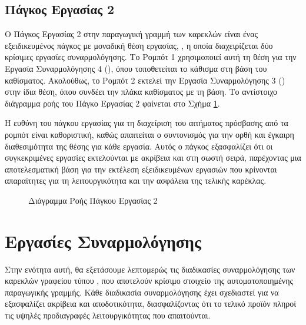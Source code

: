 \subsection{Πάγκος Εργασίας 2}
\noindent Ο Πάγκος Εργασίας 2 στην παραγωγική γραμμή των καρεκλών  είναι ένας εξειδικευμένος πάγκος με μοναδική θέση εργασίας, , η οποία διαχειρίζεται δύο κρίσιμες εργασίες συναρμολόγησης. Το Ρομπότ 1 χρησιμοποιεί αυτή τη θέση για την Εργασία Συναρμολόγησης 4 (), όπου τοποθετείται το κάθισμα στη βάση του καθίσματος. Ακολούθως, το Ρομπότ 2 εκτελεί την Εργασία Συναρμολόγησης 3 () στην ίδια θέση, όπου συνδέει την πλάκα καθίσματος με τη βάση. Το αντίστοιχο διάγραμμα ροής του Πάγκο Εργασίας 2 φαίνεται στο Σχήμα \ref{fig:workbench2_flowchart}.

Η ευθύνη του πάγκου εργασίας για τη διαχείριση του αιτήματος πρόσβασης από τα ρομπότ είναι καθοριστική, καθώς απαιτείται ο συντονισμός για την ορθή και έγκαιρη διαθεσιμότητα της θέσης για κάθε εργασία. Αυτός ο πάγκος εξασφαλίζει ότι οι συγκεκριμένες εργασίες εκτελούνται με ακρίβεια και στη σωστή σειρά, παρέχοντας μια αποτελεσματική βάση για την εκτέλεση εξειδικευμένων εργασιών που κρίνονται απαραίτητες για τη λειτουργικότητα και την ασφάλεια της τελικής καρέκλας.


\begin{figure}[H]
    \centering
    \caption{Διάγραμμα Ροής Πάγκου Εργασίας 2}
    \label{fig:workbench2_flowchart}
\end{figure}

\section{Εργασίες Συναρμολόγησης}
\noindent Στην ενότητα αυτή, θα εξετάσουμε λεπτομερώς τις διαδικασίες συναρμολόγησης των καρεκλών γραφείου τύπου , που αποτελούν κρίσιμο στοιχείο της αυτοματοποιημένης παραγωγικής γραμμής. Κάθε διαδικασία συναρμολόγησης έχει σχεδιαστεί για να εξασφαλίζει ακρίβεια και αποδοτικότητα, διασφαλίζοντας ότι το τελικό προϊόν πληροί τις υψηλές προδιαγραφές λειτουργικότητας που απαιτούνται.

